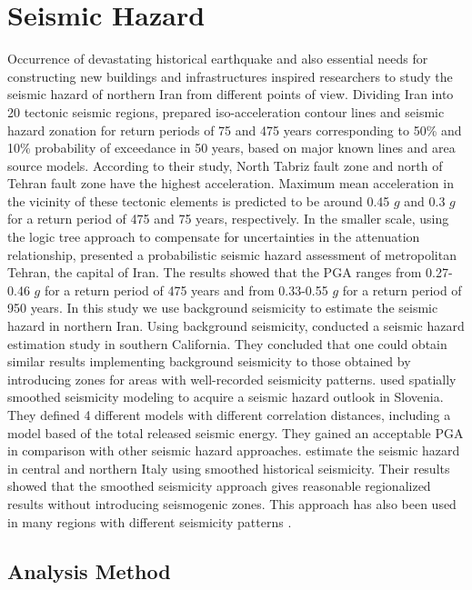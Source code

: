 \section{Seismic Hazard}

Occurrence of devastating historical earthquake and also essential needs for constructing new buildings and infrastructures inspired researchers to study the seismic hazard of northern Iran from different points of view. Dividing Iran into 20 tectonic seismic regions, \citet{Tavakoli1999} prepared iso-acceleration contour lines and seismic hazard zonation for return periods of 75 and 475 years corresponding to 50\% and 10\% probability of exceedance in 50 years, based on major known lines and area source models. According to their study, North Tabriz fault zone and north of Tehran fault zone have the highest acceleration. Maximum mean acceleration in the vicinity of these tectonic elements is predicted to be around 0.45 $g$ and 0.3 $g$ for a return period of 475 and 75 years, respectively. In the smaller scale, using the logic tree approach to compensate for uncertainties in the attenuation relationship, \citet{Ghodrati2003} presented a probabilistic seismic hazard assessment of metropolitan Tehran, the capital of Iran. The results showed that the PGA ranges from 0.27-0.46 $g$ for a return period of 475 years and from 0.33-0.55 $g$ for a return period of 950 years. 
In this study we use background seismicity to estimate the seismic hazard in northern Iran. Using background seismicity, \citet{Cao1996} conducted a seismic hazard estimation study in southern California. They concluded that one could obtain similar results implementing background seismicity to those obtained by introducing zones for areas with well-recorded seismicity patterns. \citet{Lapajne1997} used spatially smoothed seismicity modeling to acquire a seismic hazard outlook in Slovenia. They defined 4 different models with different correlation distances, including a model based of the total released seismic energy. They gained an acceptable PGA in comparison with other seismic hazard approaches. \citet{Akinci2004} estimate the seismic hazard in central and northern Italy using smoothed historical seismicity. Their results showed that the smoothed seismicity approach gives reasonable regionalized results without introducing seismogenic zones. This approach has also been used in many regions with different seismicity patterns \citep{Wesson1999, Klein2001, Hamdache2008, Kalkan2009, Moschetti2014, Boyd2008}.

\subsection{Analysis Method}
